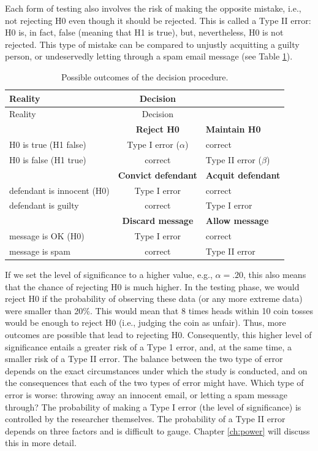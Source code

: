 \documentclass[
]{book}
\begin{document}
Each form of testing also involves the risk of making the opposite mistake, i.e., not rejecting H0 even though it should be rejected. This is called a Type II error: H0 is, in fact, false (meaning that H1 is true), but, nevertheless, H0 is not rejected. This type of mistake can be compared to unjustly acquitting a guilty person, or undeservedly letting through a spam email message (see Table \ref{tab:H0H1outcomes}).

\begin{longtable}[]{@{}lcl@{}}
\caption{\label{tab:H0H1outcomes} Possible outcomes of the decision procedure.}\tabularnewline
\toprule
Reality & Decision &\tabularnewline
\midrule
\endfirsthead
\toprule
Reality & Decision &\tabularnewline
\midrule
\endhead
& \textbf{Reject H0} & \textbf{Maintain H0}\tabularnewline
H0 is true (H1 false) & Type I error (\(\alpha\)) & correct\tabularnewline
H0 is false (H1 true) & correct & Type II error (\(\beta\))\tabularnewline
& \textbf{Convict defendant} & \textbf{Acquit defendant}\tabularnewline
defendant is innocent (H0) & Type I error & correct\tabularnewline
defendant is guilty & correct & Type I error\tabularnewline
& \textbf{Discard message} & \textbf{Allow message}\tabularnewline
message is OK (H0) & Type I error & correct\tabularnewline
message is spam & correct & Type II error\tabularnewline
\bottomrule
\end{longtable}

If we set the level of significance to a higher value, e.g., \(\alpha = .20\), this also means that the chance of rejecting H0 is much higher. In the testing phase, we would reject H0 if the probability of observing these data (or any more extreme data) were smaller than 20\%. This would mean that 8 times heads within 10 coin tosses would be enough to reject H0 (i.e., judging the coin as unfair). Thus, more outcomes are possible that lead to rejecting H0. Consequently, this higher level of significance entails a greater risk of a Type 1 error, and, at the same time, a smaller risk of a Type II error. The balance between the two type of error depends on the exact circumstances under which the study is conducted, and on the consequences that each of the two types of error might have. Which type of error is worse: throwing away an innocent email, or letting a spam message through? The probability of making a Type I error (the level of significance) is controlled by the researcher themselves. The probability of a Type II error depends on three factors and is difficult to gauge. Chapter \ref{ch:power} will discuss this in more detail.
\end{document}
